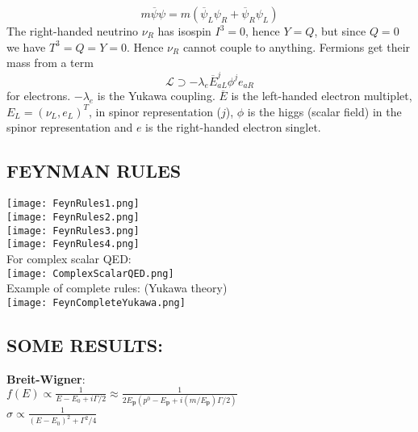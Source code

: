 \documentclass[a4paper, norsk, 8pt, landscape]{article}
\begin{document}
\begin{multicols*}{3}
\[
m \overline{\psi}\psi = m( \overline{\psi}_L \psi_R + \overline{\psi}_R \psi_L )
\]
The right-handed neutrino $\nu_R$ has isospin $I^3=0$, hence $Y=Q$, but since $Q=0$ we have
$T^3=Q=Y=0$. Hence $\nu_R$ cannot couple to anything. Fermions get their mass from a term
\[
\mathcal{L} \supset -\lambda_e \overline{E}^j_{aL} \phi^j e_{aR}
\]
for electrons. $-\lambda_e$ is the Yukawa coupling. $\overline{E}$ is the left-handed electron multiplet,
$E_L=(\nu_L,e_L)^T$, in spinor representation ($j$), $\phi$ is the higgs (scalar field) in the spinor
representation and $e$ is the right-handed electron singlet.






















\subsection*{\small  FEYNMAN RULES}
\texttt{[image: FeynRules1.png]} \\
\texttt{[image: FeynRules2.png]} \\
\texttt{[image: FeynRules3.png]} \\
\texttt{[image: FeynRules4.png]} \\

For complex scalar QED: \\
\texttt{[image: ComplexScalarQED.png]} \\


Example of complete rules: (Yukawa theory)\\
\texttt{[image: FeynCompleteYukawa.png]} \\








\subsection*{\small  SOME RESULTS:}
\textbf{Breit-Wigner}: \\
$f(E)\propto \frac{1}{E-E_0+i\Gamma/2}
\approx \frac{1}{2E_\mathbf{p}(p^0-E_\mathbf{p}+i(m/E_\mathbf{p})\Gamma/2)}$ \\
$\sigma \propto \frac{1}{(E-E_0)^2+\Gamma^2/4}$ \\


\end{multicols*}
\end{document}

